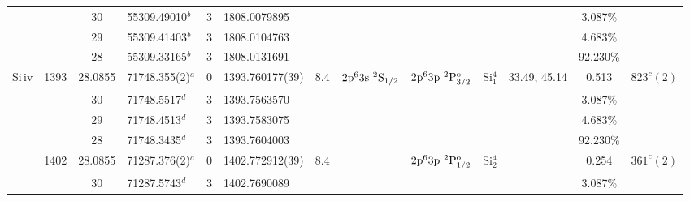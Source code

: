 \begin{table*}
\begin{center}
{\begin{tabular}{:l;l;c;l;c;l;c;l;l;c;c;c;c}
\rowstyle{\itshape}               &        & 30        & 55309.49010$^{b}$                & 3 &  1808.0079895      &      & $                                        $ & $                                        $ &             &              & 3.087\%   & $     ^{}     $\\
\rowstyle{\itshape}               &        & 29        & 55309.41403$^{b}$                & 3 &  1808.0104763      &      & $                                        $ & $                                        $ &             &              & 4.683\%   & $     ^{}     $\\
\rowstyle{\itshape}               &        & 28        & 55309.33165$^{b}$                & 3 &  1808.0131691      &      & $                                        $ & $                                        $ &             &              & 92.230\%  & $     ^{}     $\\
                    Si{\sc \,iv}  & 1393   & 28.0855   & 71748.355(2)$^{a}$               & 0 &   1393.760177(39)  &  8.4 & $2\rm{p}^63\rm{s}~^2\rm{S}_{1/2}         $ & $2\rm{p}^63\rm{p}~^2\rm{P}_{3/2}^{\rm o} $ & Si$^4_{1}$  & 33.49, 45.14 & 0.513     & $  823^{c}(2)  $\\
\rowstyle{\itshape}               &        & 30        & 71748.5517$^{d}$                 & 3 &  1393.7563570      &      & $                                        $ & $                                        $ &             &              & 3.087\%   & $     ^{}     $\\
\rowstyle{\itshape}               &        & 29        & 71748.4513$^{d}$                 & 3 &  1393.7583075      &      & $                                        $ & $                                        $ &             &              & 4.683\%   & $     ^{}     $\\
\rowstyle{\itshape}               &        & 28        & 71748.3435$^{d}$                 & 3 &  1393.7604003      &      & $                                        $ & $                                        $ &             &              & 92.230\%  & $     ^{}     $\\
                                  & 1402   & 28.0855   & 71287.376(2)$^{a}$               & 0 &   1402.772912(39)  &  8.4 & $                                        $ & $2\rm{p}^63\rm{p}~^2\rm{P}_{1/2}^{\rm o} $ & Si$^4_{2}$  &              & 0.254     & $  361^{c}(2)  $\\
\rowstyle{\itshape}               &        & 30        & 71287.5743$^{d}$                 & 3 &  1402.7690089      &      & $                                        $ & $                                        $ &             &              & 3.087\%   & $     ^{}     $\\

\end{tabular}}
\end{center}
\end{table*}
